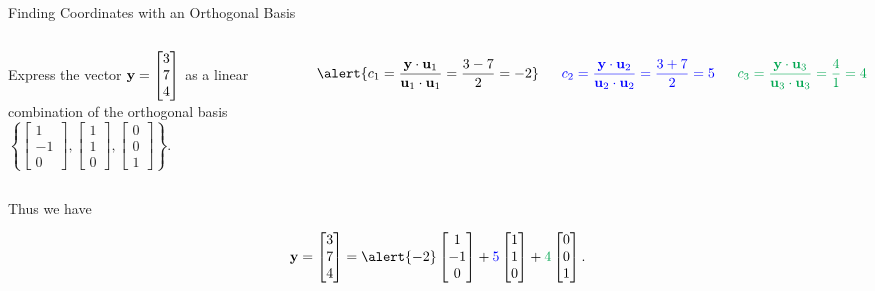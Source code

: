 \documentclass[xcolor=dvipsnames,aspectratio=169,t]{beamer}
\begin{document}
\begin{frame}{Finding Coordinates with an Orthogonal Basis}
  \begin{columns}
  \column{0.6\tw}
  \begin{example}
  Express the vector $\mathbf{y} = \begin{bmatrix} 3 \\ 7 \\ 4 \end{bmatrix}$ as a linear combination of the orthogonal basis $\left\{ \begin{bmatrix} 1 \\ -1 \\ 0 \end{bmatrix}, \begin{bmatrix} 1 \\ 1 \\ 0 \end{bmatrix}, \begin{bmatrix} 0 \\ 0 \\ 1 \end{bmatrix} \right\}$.
  \end{example}

  \pause
  \column{0.4\tw}
  \[ \alert{c_1 = \frac{\y \cdot \u_1}{\u_1 \cdot \u_1} = \frac{3-7}{2} = -2} \]

  \[ \textcolor{blue}{c_2 = \frac{\mathbf{y} \cdot \mathbf{u}_2}{\mathbf{u}_2 \cdot \mathbf{u}_2} = \frac{3+7}{2} = 5} \]

  \[ \colorg{c_3 = \frac{\y \cdot \u_3}{\u_3 \cdot \u_3} = \frac{4}{1} = 4} \]
  \end{columns}

  \ms

  Thus we have 
  
  \[ \y = \begin{bmatrix} 3 \\ 7 \\ 4 \end{bmatrix}
  = \alert{-2}  \begin{bmatrix} 1 \\ -1 \\ 0 \end{bmatrix} 
  + \colorb{5}  \begin{bmatrix} 1 \\ 1 \\ 0 \end{bmatrix} 
  + \colorg{4} \begin{bmatrix} 0 \\ 0 \\ 1 \end{bmatrix} 
  .\]
\end{frame}
\end{document}
